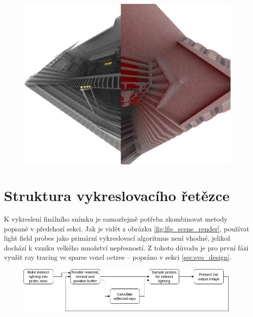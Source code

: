 \begin{figure}[H]
	\centering
	\includegraphics[scale=1]{images/indirect_probe.png}
	\captionsetup{justification=centering}
	\label{fig:diffuse_rays}
\end{figure}


\section{Struktura vykreslovacího řetězce}

K vykreslení finálního snímku je samozřejmě potřeba zkombinovat metody popsané v předchozí sekci. Jak je vidět z obrázku \ref{fig:lfp_scene_render}, používat light field probes jako primární vykreslovací algoritmus není vhodné, jelikož dochází k vzniku velkého množství nepřesností. Z tohoto důvodu je pro první fázi využit ray tracing ve sparse voxel octree -- popsáno v sekci \ref{sec:svo_design}.

\begin{figure}[H]
	\centering
	\includegraphics[scale=0.5]{images/my_render_pipeline.png}
	\captionsetup{justification=centering}
	\label{fig:gbuffer_contents}
\end{figure}

